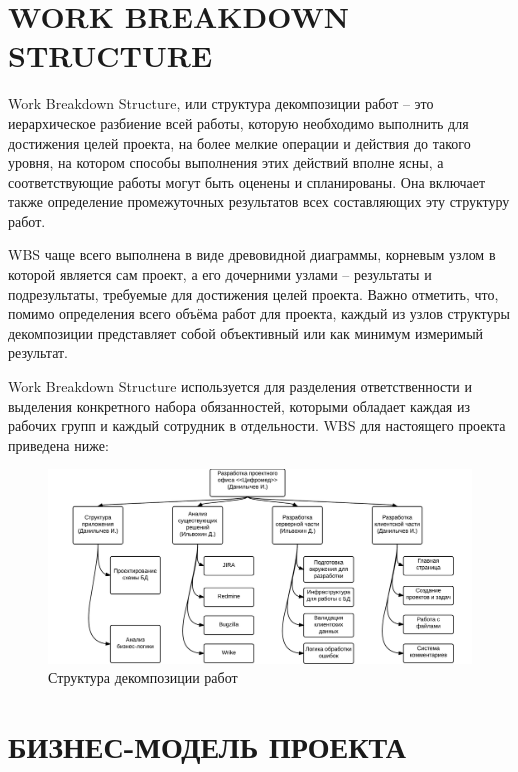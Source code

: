 \documentclass[14pt, a4paper]{extreport}
\begin{document}
\section{\MakeTextUppercase{Work Breakdown Structure}}
Work Breakdown Structure, или структура декомпозиции работ -- это иерархическое разбиение всей работы, которую необходимо выполнить для достижения целей проекта, на более мелкие операции и действия до такого уровня, на котором способы выполнения этих действий вполне ясны, а соответствующие работы могут быть оценены и спланированы. Она включает также определение промежуточных результатов всех составляющих эту структуру работ.

WBS чаще всего выполнена в виде древовидной диаграммы, корневым узлом в которой является сам проект, а его дочерними узлами -- результаты и подрезультаты, требуемые для достижения целей проекта. Важно отметить, что, помимо определения всего объёма работ для проекта, каждый из узлов структуры декомпозиции представляет собой объективный или как минимум измеримый результат.

Work Breakdown Structure используется для разделения ответственности и выделения конкретного набора обязанностей, которыми обладает каждая из рабочих групп и каждый сотрудник в отдельности. WBS для настоящего проекта приведена ниже:


\vspace{1em}

\begin{figure}[!htb]
  \centering
    \includegraphics[scale=0.25]{../shared_images/wbs.png}
   \caption{Структура декомпозиции работ}
    \label{fig:start}
\end{figure}
\newpage


\section{\MakeTextUppercase{Бизнес-модель проекта}}
\end{document}
